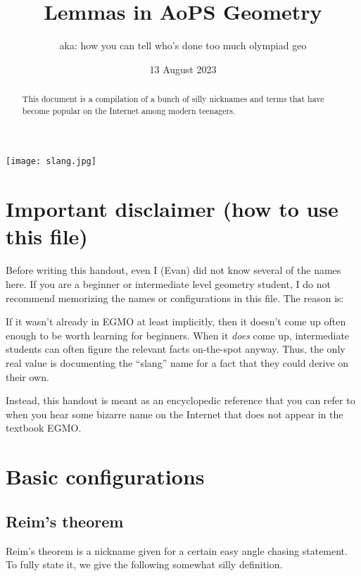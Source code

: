 \documentclass[11pt]{scrartcl}
\begin{document}
\title{Lemmas in AoPS Geometry}
\subtitle{aka: how you can tell who's done too much olympiad geo}
\date{13 August 2023}
\maketitle

\begin{center}
  \texttt{[image: slang.jpg]}
\end{center}

\begin{abstract}
  This document is a compilation of a bunch of silly nicknames and terms
  that have become popular on the Internet among modern teenagers.
\end{abstract}

\section*{Important disclaimer (how to use this file)}
Before writing this handout, even I (Evan)
did not know several of the names here.
If you are a beginner or intermediate level geometry student,
\alert{I do not recommend memorizing the names or configurations in this file}.
The reason is:
\begin{itemize}
  \ii If it wasn't already in EGMO at least implicitly,
  then it doesn't come up often enough to be worth learning for beginners.
  \ii When it \emph{does} come up, intermediate students can often figure
  the relevant facts on-the-spot anyway. Thus, the only real value is
  documenting the ``slang'' name for a fact that they could derive on their own.
\end{itemize}
Instead, this handout is meant as an encyclopedic reference that you can refer to
when you hear some bizarre name on the Internet that does not appear
in the textbook EGMO.

\newpage

\tableofcontents

\newpage

\section{Basic configurations}
\subsection{Reim's theorem}
Reim's theorem is a nickname given for a certain easy angle chasing statement.
To fully state it, we give the following somewhat silly definition.
\end{document}
